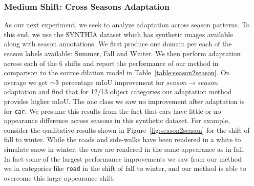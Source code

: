 \documentclass[10pt,twocolumn,letterpaper]{article}
\begin{document}
 \subsubsection{Medium Shift: Cross Seasons Adaptation}
As our next experiment, we seek to analyze adaptation across season patterns. To this end, we use the SYNTHIA dataset which has synthetic images available along with season annotations. We first produce one domain per each of the season labels available: Summer, Fall and Winter. We then perform adaptation across each of the $6$ shifts and report the performance of our method in comparison to the source dilation model in Table~\ref{table:season2season}. On average we get $\scriptsize{\sim} 3$ percentage mIoU improvement for $season\rightarrow season$ adaptation and find that for 12/13 object categories our adaptation method provides higher mIoU. The one class we saw no improvement after adaptation is for \texttt{car}. We presume this results from the fact that cars have little or no appearance difference across seasons in this synthetic dataset. For example, consider the qualitative results shown in Figure~\ref{fig:season2season} for the shift of fall to winter. While the roads and side-walks have been rendered in a white to simulate snow in winter, the cars are rendered in the same appearance as in fall. In fact some of the largest performance improvements we saw from our method we in categories like \texttt{road} in the shift of fall to winter, and our method is able to overcome this large appearance shift. 
\end{document}
